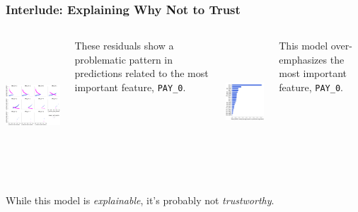 \documentclass[11pt,
               aspectratio=169,
               hyperref={colorlinks}
               ]{beamer}
\begin{document}
			
			\begin{frame}
		
				\frametitle{Interlude: Explaining Why Not to Trust}		
			

				\begin{columns}
	
					\centering
					\includegraphics[height=140pt]{../img/resid.png}
					
					\tiny{These residuals show a problematic pattern in predictions related to the most important feature, \texttt{PAY\_0}.}
				
					
					\centering
					\includegraphics[height=132pt]{../img/global_shap.png}
					
					\tiny{This model over-emphasizes the most important feature, \texttt{PAY\_0}.}
				
				\end{columns}
			
				\vspace{10pt}
			
				\centering
				\footnotesize{While this model is \textit{explainable}, it's probably not \textit{trustworthy}.}
			
			\end{frame}
			
\end{document}
